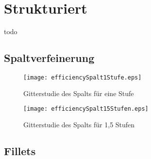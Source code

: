 \section{Strukturiert}todo
\todo
\subsection{Spaltverfeinerung}
\begin{figure}[htbp]
	\centering
	\label{effSpalt1}
	\texttt{[image: efficiencySpalt1Stufe.eps]}
	\caption{Gitterstudie des Spalts für eine Stufe}
\end{figure}

\begin{figure}[htbp]
	\centering
	\label{effSpalt15}
	\texttt{[image: efficiencySpalt15Stufen.eps]}
	\caption{Gitterstudie des Spalts für 1,5 Stufen}
\end{figure}

\subsection{Fillets}
\todo